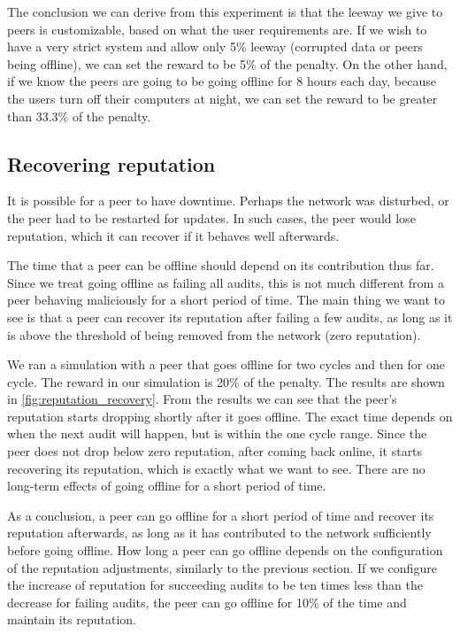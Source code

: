 The conclusion we can derive from this experiment is that the leeway we give to peers is customizable,
based on what the user requirements are.
If we wish to have a very strict system and allow only 5\% leeway (corrupted data or peers being offline),
we can set the reward to be 5\% of the penalty.
On the other hand, if we know the peers are going to be going offline for 8 hours each day,
because the users turn off their computers at night, we can set the reward to be greater than 33.3\% of the penalty.

\subsection{Recovering reputation}

It is possible for a peer to have downtime.
Perhaps the network was disturbed, or the peer had to be restarted for updates.
In such cases, the peer would lose reputation, which it can recover if it behaves well afterwards.

The time that a peer can be offline should depend on its contribution thus far.
Since we treat going offline as failing all audits, this is not much different from a peer
behaving maliciously for a short period of time.
The main thing we want to see is that a peer can recover its reputation after failing a few audits,
as long as it is above the threshold of being removed from the network (zero reputation).

We ran a simulation with a peer that goes offline for two cycles and then for one cycle.
The reward in our simulation is 20\% of the penalty.
The results are shown in \autoref{fig:reputation_recovery}.
From the results we can see that the peer's reputation starts dropping shortly after it goes offline.
The exact time depends on when the next audit will happen, but is within the one cycle range.
Since the peer does not drop below zero reputation, after coming back online, it starts recovering its
reputation, which is exactly what we want to see.
There are no long-term effects of going offline for a short period of time.

As a conclusion, a peer can go offline for a short period of time and recover its reputation afterwards,
as long as it has contributed to the network sufficiently before going offline.
How long a peer can go offline depends on the configuration of the reputation adjustments,
similarly to the previous section.
If we configure the increase of reputation for succeeding audits to be ten times less than the decrease
for failing audits, the peer can go offline for 10\% of the time and maintain its reputation.

